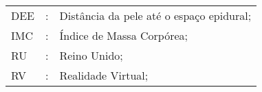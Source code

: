 \listoffigures


\cleardoublepage
\listoftables
\cleardoublepage

\cleardoublepage
{}
\begin{tabular}{lcl}
DEE & : & Distância da pele até o espaço epidural;\\
IMC & : & Índice de Massa Corpórea;\\
RU & : & Reino Unido;\\
RV & : & Realidade Virtual;\\



\end{tabular}
\pagestyle{ruledheader}
\tableofcontents


